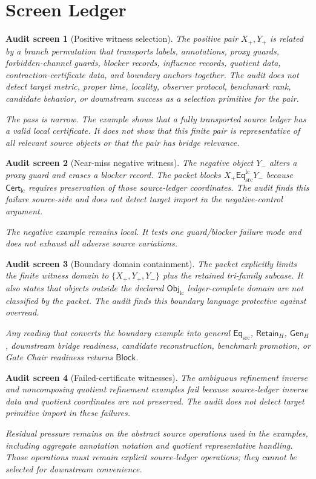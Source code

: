 \documentclass[11pt]{article}
\newcommand{\EqSrc}{\mathsf{Eq}_{\mathrm{src}}}
\newcommand{\EqLC}{\mathsf{Eq}_{\mathrm{src}}^{\mathrm{lc}}}
\newcommand{\ObjLC}{\mathsf{Obj}_{\mathrm{lc}}}
\newcommand{\CertLC}{\mathsf{Cert}_{\mathrm{lc}}}
\newcommand{\RetainH}{\mathsf{Retain}_{H}}
\newcommand{\GenH}{\mathsf{Gen}_{H}}
\newcommand{\Block}{\mathsf{Block}}
\newtheorem{screen}{Audit screen}
\begin{document}
\section{Screen Ledger}

\begin{screen}[Positive witness selection]
The positive pair \(X_{+},Y_{+}\) is related by a branch permutation
that transports labels, annotations, proxy guards, forbidden-channel
guards, blocker records, influence records, quotient data,
contraction-certificate data, and boundary anchors together. The audit
does not detect target metric, proper time, locality, observer
protocol, benchmark rank, candidate behavior, or downstream success as
a selection primitive for the pair.

The pass is narrow. The example shows that a fully transported source
ledger has a valid local certificate. It does not show that this finite
pair is representative of all relevant source objects or that the pair
has bridge relevance.
\end{screen}

\begin{screen}[Near-miss negative witness]
The negative object \(Y_{-}\) alters a proxy guard and erases a blocker
record. The packet blocks \(X_{+}\EqLC Y_{-}\) because \(\CertLC\)
requires preservation of those source-ledger coordinates. The audit
finds this failure source-side and does not detect target import in the
negative-control argument.

The negative example remains local. It tests one guard/blocker failure
mode and does not exhaust all adverse source variations.
\end{screen}

\begin{screen}[Boundary domain containment]
The packet explicitly limits the finite witness domain to
\(\{X_{+},Y_{+},Y_{-}\}\) plus the retained tri-family subcase. It also
states that objects outside the declared \(\ObjLC\) ledger-complete
domain are not classified by the packet. The audit finds this boundary
language protective against overread.

Any reading that converts the boundary example into general
\(\EqSrc\), \(\RetainH\), \(\GenH\), downstream bridge readiness,
candidate reconstruction, benchmark promotion, or Gate Chair readiness
returns \(\Block\).
\end{screen}

\begin{screen}[Failed-certificate witnesses]
The ambiguous refinement inverse and noncomposing quotient refinement
examples fail because source-ledger inverse data and quotient
coordinates are not preserved. The audit does not detect target
primitive import in these failures.

Residual pressure remains on the abstract source operations used in the
examples, including aggregate annotation notation and quotient
representative handling. Those operations must remain explicit
source-ledger operations; they cannot be selected for downstream
convenience.
\end{screen}
\end{document}
